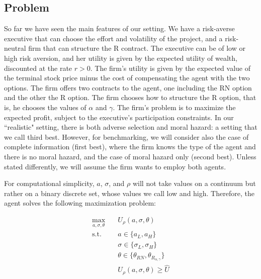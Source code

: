 \subsection{Problem}
So far we have seen the main features of our setting. We have a risk-averse executive that can choose the effort and volatility of the project, and a risk-neutral firm that can structure the R contract. The executive can be of low or high risk aversion, and her utility is given by the expected utility of wealth, discounted at the rate $r>0$. The firm's utility is given by the expected value of the terminal stock price minus the cost of compensating the agent with the two options. The firm offers two contracts to the agent, one including the RN option and the other the R option. The firm chooses how to structure the R option, that is, he chooses the values of $\alpha$ and $\gamma$. The firm's problem is to maximize the expected profit, subject to the executive's participation constraints. In our ``realistic" setting, there is both adverse selection and moral hazard: a setting that we call third best. However, for benchmarking, we will consider also the case of complete information (first best), where the firm knows the type of the agent and there is no moral hazard, and the case of moral hazard only (second best). Unless stated differently, we will assume the firm wants to employ both agents.

For computational simplicity, $a$, $\sigma$, and $\rho$ will not take values on a continuum but rather on a binary discrete set, whose values we call low and high. Therefore, the agent solves the following maximization problem:

\begin{equation}
    \label{eqn:agent_problem}
    \begin{aligned}
    \max_{a, \sigma, \theta} \quad & U_\rho (a, \sigma, \theta) \\
    \textrm{s.t.}       \quad & a \in \{ a_L, a_H \} \\
                        \quad & \sigma \in \{ \sigma_L, \sigma_H \} \\
                        \quad & \theta \in \{\theta_{RN}, \theta_{R_{\alpha, \gamma}} \} \\
                        \quad & U_\rho(a, \sigma, \theta) \ge \hat{U}  \\
    \end{aligned}
\end{equation}
\vspace*{4pt}

